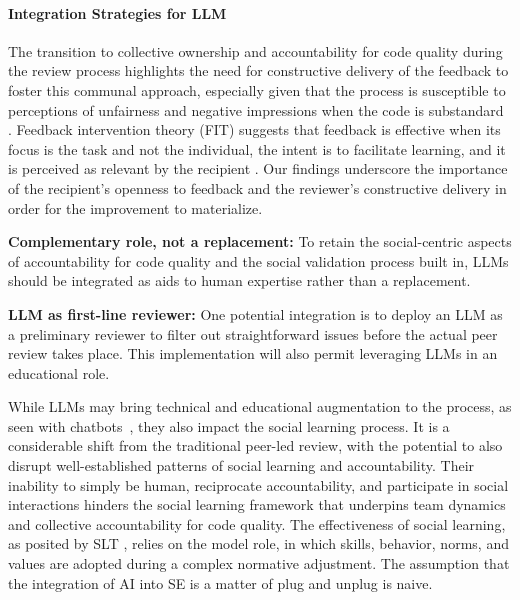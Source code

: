 \paragraph*{Integration Strategies for LLM}

The transition to collective ownership and accountability for code quality during the review process highlights the need for constructive delivery of the feedback to foster this communal approach, especially given that the process is susceptible to perceptions of unfairness \citep{german2018my} and negative impressions when the code is substandard \citep{bosu2013impact,bosu2016process}. Feedback intervention theory (FIT) suggests that feedback is effective when its focus is the task and not the individual, the intent is to facilitate learning, and it is perceived as relevant by the recipient \citep{kluger1996effects}. Our findings underscore the importance of the recipient's openness to feedback and the reviewer's constructive delivery in order for the improvement to materialize.

\begin{tcolorbox}

\textbf{Complementary role, not a replacement:} To retain the social-centric aspects of accountability for code quality and the social validation process built in, LLMs should be integrated as aids to human expertise rather than a replacement.

\noindent \textbf{LLM as first-line reviewer:} One potential integration is to deploy an LLM as a preliminary reviewer to filter out straightforward issues before the actual peer review takes place. This implementation will also permit leveraging LLMs in an educational role.

\end{tcolorbox}

While LLMs may bring technical and educational augmentation to the process, as seen with chatbots~\citep{Wessel2022}, they also impact the social learning process. It is a considerable shift from the traditional peer-led review, with the potential to also disrupt well-established patterns of social learning and accountability. Their inability to simply be human, reciprocate accountability, and participate in social interactions hinders the social learning framework that underpins team dynamics and collective accountability for code quality. The effectiveness of social learning, as posited by SLT \citep{bandura1977social,bandura1986social}, relies on the model role, in which skills, behavior, norms, and values are adopted during a complex normative adjustment. The assumption that the integration of AI into SE is a matter of plug and unplug is naive.

